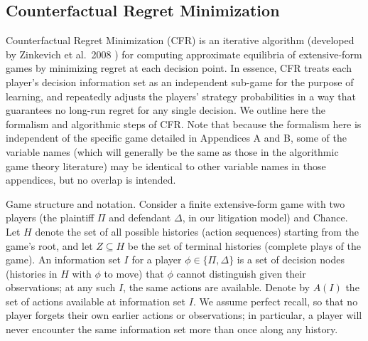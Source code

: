 \documentclass{article}
\begin{document}
\subsection{Counterfactual Regret Minimization}\label{app:CFR}

Counterfactual Regret Minimization (CFR) is an iterative algorithm (developed by Zinkevich et al.\ 2008 \cite{zinkevichetal}) for computing approximate equilibria of extensive-form games by minimizing regret at each decision point. In essence, CFR treats each player’s decision information set as an independent sub-game for the purpose of learning, and repeatedly adjusts the players’ strategy probabilities in a way that guarantees no long-run regret for any single decision. We outline here the formalism and algorithmic steps of CFR. Note that because the formalism here is independent of the specific game detailed in Appendices A and B, some of the variable names (which will generally be the same as those in the algorithmic game theory literature) may be identical to other variable names in those appendices, but no overlap is intended.

Game structure and notation. Consider a finite extensive-form game with two players (the plaintiff $\Pi$ and defendant $\Delta$, in our litigation model) and Chance. Let $H$ denote the set of all possible histories (action sequences) starting from the game’s root, and let $Z \subseteq H$ be the set of terminal histories (complete plays of the game). An information set $I$ for a player $\phi \in \{\Pi,\Delta\}$ is a set of decision nodes (histories in $H$ with $\phi$ to move) that $\phi$ cannot distinguish given their observations; at any such $I$, the same actions are available. Denote by $A(I)$ the set of actions available at information set $I$. We assume perfect recall, so that no player forgets their own earlier actions or observations; in particular, a player will never encounter the same information set more than once along any history.
\end{document}
